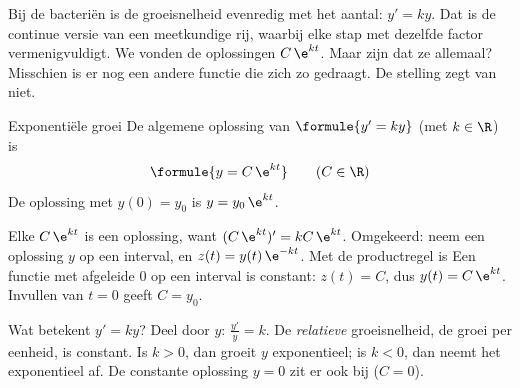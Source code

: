 Bij de bacteriën is de groeisnelheid evenredig met het aantal: $y' = ky$. Dat is de continue versie van een meetkundige rij, waarbij elke stap met dezelfde factor vermenigvuldigt. We vonden de oplossingen $C\,\e^{kt}$. Maar zijn dat ze allemaal? Misschien is er nog een andere functie die zich zo gedraagt. De stelling zegt van niet.

\begin{theorie}
\begin{stelling}{Exponentiële groei}
De algemene oplossing van $\formule{y' = ky}$ (met $k \in \R$) is
\[
\formule{y = C\,\e^{kt}} \qquad (C \in \R)
\]
De oplossing met $y(0) = y_0$ is $y = y_0\,\e^{kt}$.
\end{stelling}

\begin{bewijs}
Elke $C\,\e^{kt}$ is een oplossing, want $(C\,\e^{kt})' = kC\,\e^{kt}$. Omgekeerd: neem een oplossing $y$ op een interval, en $z(t) = y(t)\,\e^{-kt}$. Met de productregel is
Een functie met afgeleide 0 op een interval is constant: $z(t) = C$, dus $y(t) = C\,\e^{kt}$. Invullen van $t = 0$ geeft $C = y_0$.
\end{bewijs}
\end{theorie}

Wat betekent $y' = ky$? Deel door $y$: $\tfrac{y'}{y} = k$. De \textit{relatieve} groeisnelheid, de groei per eenheid, is constant. Is $k > 0$, dan groeit $y$ exponentieel; is $k < 0$, dan neemt het exponentieel af. De constante oplossing $y = 0$ zit er ook bij ($C = 0$).


